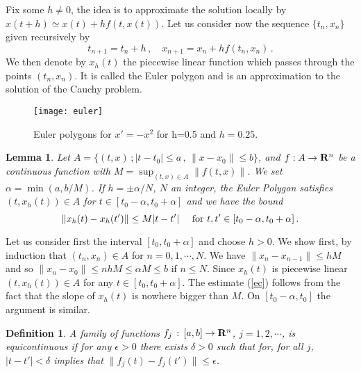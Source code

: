 \documentclass[12pt]{report}
\newcommand{\bR}{{\bf R}}
\newtheorem{lemma}[theorem]{Lemma}
\newtheorem{definition}[theorem]{Definition}
\newcommand{\proof}{\noindent {\em Proof:~}}
\def\eqref#1{(\ref{#1})}
\def\qed{\hbox{\hskip 6pt\vrule width6pt height7pt depth1pt
    \hskip1pt}\bigskip}
\def\to{\rightarrow}
\begin{document}
\vspace{2mm}
 Fix some $h\not= 0$, the idea is
to approximate the solution locally by $x(t+h) \simeq x(t) + h f(t,
x(t))$.  Let us consider now the sequence $\{t_n, x_n\}$ given
recursively by
\begin{equation}
t_{n+1} = t_n +h\,, \quad x_{n+1} = x_n + h f(t_n, x_n) \,.
\end{equation} 
We then denote by $x_h(t)$ the piecewise linear function which passes
through the points $(t_n,x_n)$.  It is called the Euler polygon and is
an approximation to the solution of the Cauchy problem.

\begin{figure}[htbp]
\begin{center}
\texttt{[image: euler]}
\caption{Euler polygons for $x'=-x^2$ for h=0.5 and $h=0.25$.} 
\label{euler}
\end{center}
\end{figure}


\begin{lemma}\label{eqco} 
 Let $A= \{ (t,x) \,; |t-t_0| \le a \,,\, \|x-x_0\| \le b\}$, and $f : A \to
 \bR^n$ be a continuous function with $M = \sup_{(t,x) \in A} \|f(t,x)\|$.
 We set $\alpha = \min(a, b/M)$.  If $h = \pm \alpha/N$, $N$ an integer,
 the Euler Polygon satisfies $(t, x_h(t)) \in A$ for $t \in [t_0-\alpha,
 t_0+\alpha]$ and we have the bound
\begin{equation}\label{ec}
\|x_h(t) - x_h(t')\| \le M |t-t'| \quad {\rm ~for~} t, t' 
\in [t_0- \alpha, t_0+\alpha]\,.
\end{equation}
\end{lemma}

\proof Let us consider first the interval $[t_0, t_0+\alpha]$ and
choose $h>0$.  We show first, by induction that $(t_n,x_n) \in A$ for
$n=0,1,\cdots,N$.  We have $\|x_{n} - x_{n-1}\| \le h M$ and so
$\|x_{n} - x_0\| \le nh M \le \alpha M \le b$ if $n \le N$.
Since $x_h(t)$ is piecewise linear $(t,x_h(t)) \in A$ for any $t \in
[t_0, t_0+\alpha]$.  The estimate \eqref{ec} follows from the fact
that the slope of $x_h(t)$ is nowhere bigger than $M$.  On
$[t_0-\alpha, t_0]$ the argument is similar. \hfill \qed


\begin{definition} {\rm 
A family of functions $f_j \,:\, [a,b] \to \bR^n$, $j=1,2,\cdots$, is
{\em equicontinuous} if for any $\epsilon>0$ there exists $\delta >0$
such that for, for all $j$, $|t-t'| < \delta$ implies that $\| f_j(t) -
f_j(t')\| \le \epsilon$.  }
\end{definition}
\end{document}
